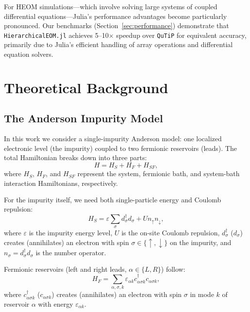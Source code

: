 \documentclass[preprint,1p]{elsarticle}
\begin{document}
For HEOM simulations—which involve solving large systems of coupled differential equations—Julia's performance advantages become particularly pronounced. Our benchmarks (Section~\ref{sec:performance}) demonstrate that \texttt{HierarchicalEOM.jl} achieves 5--10× speedup over \texttt{QuTiP} for equivalent accuracy, primarily due to Julia's efficient handling of array operations and differential equation solvers.

\section{Theoretical Background}
\label{sec:theory}

\subsection{The Anderson Impurity Model}

In this work we consider a single-impurity Anderson model: one localized electronic level (the impurity) coupled to two fermionic reservoirs (leads). The total Hamiltonian breaks down into three parts:
\begin{equation}
H = H_S + H_F + H_{SF},
\label{eq:hamiltonian}
\end{equation}
where $H_S$, $H_F$, and $H_{SF}$ represent the system, fermionic bath, and system-bath interaction Hamiltonians, respectively.

For the impurity itself, we need both single-particle energy and Coulomb repulsion:
\begin{equation}
H_S = \varepsilon \sum_{\sigma} d_{\sigma}^\dagger d_{\sigma} + U n_{\uparrow} n_{\downarrow},
\label{eq:hamiltonian_system}
\end{equation}
where $\varepsilon$ is the impurity energy level, $U$ is the on-site Coulomb repulsion, $d_{\sigma}^\dagger$ ($d_{\sigma}$) creates (annihilates) an electron with spin $\sigma \in \{\uparrow, \downarrow\}$ on the impurity, and $n_{\sigma} = d_{\sigma}^\dagger d_{\sigma}$ is the number operator.

Fermionic reservoirs (left and right leads, $\alpha \in \{L, R\}$) follow:
\begin{equation}
H_F = \sum_{\alpha, \sigma, k} \varepsilon_{\alpha k} c_{\alpha \sigma k}^\dagger c_{\alpha \sigma k},
\label{eq:hamiltonian_bath}
\end{equation}
where $c_{\alpha \sigma k}^\dagger$ ($c_{\alpha \sigma k}$) creates (annihilates) an electron with spin $\sigma$ in mode $k$ of reservoir $\alpha$ with energy $\varepsilon_{\alpha k}$.
\end{document}
